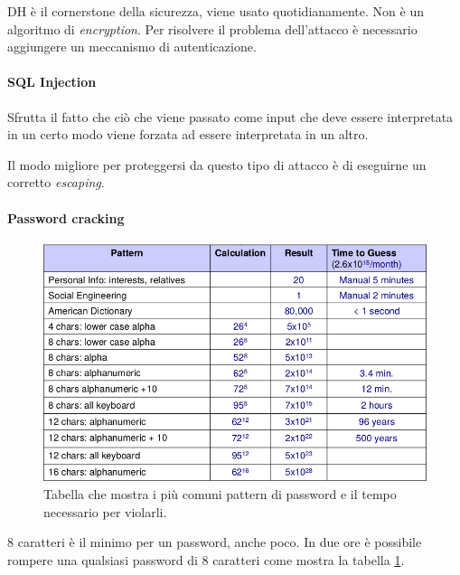 DH è il cornerstone della sicurezza, viene usato quotidianamente. Non è un 
algoritmo di \textit{encryption}.
Per risolvere il problema dell'attacco è necessario aggiungere un meccanismo di 
autenticazione.

\paragraph{SQL Injection}

Sfrutta il fatto che ciò che viene passato come input che deve essere 
interpretata in un certo modo viene forzata ad essere interpretata in un altro.

Il modo migliore per proteggersi da questo tipo di attacco è di eseguirne un 
corretto \textit{escaping}.

\paragraph{Password cracking}

\begin{figure}[h!]
	\begin{center}
		\includegraphics[scale=0.65]{res/img/password_cracking_table.png}
	\end{center}
	\caption{Tabella che mostra i più comuni pattern di password e il tempo necessario per violarli.}
	\label{fig:password:cracking:table}
\end{figure}

8 caratteri è il minimo per un password, anche poco. In due ore è possibile 
rompere una qualsiasi password di 8 caratteri come mostra la tabella \ref{fig:password:cracking:table}.
